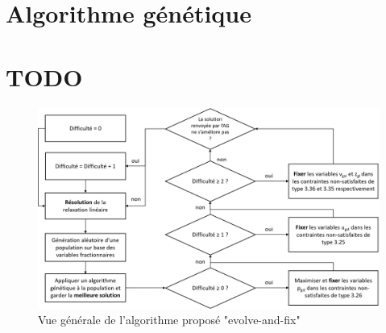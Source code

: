 \vspace*{1.2cm}

\section{Algorithme génétique}



\section{TODO}

\begin{figure}[h!]
    \begin{center}
        \includegraphics[width=\textwidth]{imgs/evolveandfix.png}\\
        Vue générale de l'algorithme proposé "evolve-and-fix"
    \end{center}
\end{figure}